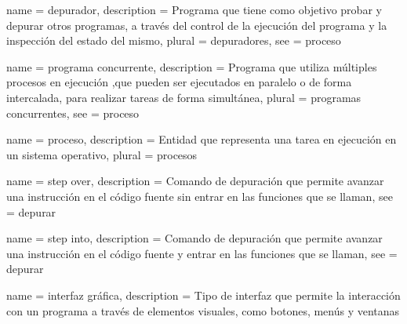 \makeglossaries





 {
    name = {depurador},
    description = {Programa que tiene como objetivo probar y depurar otros programas, a través del control de la ejecución del programa y la inspección del estado del mismo},
    plural = {depuradores},
    see = {proceso}
}

 {
    name = {programa concurrente},
    description = {Programa que utiliza múltiples procesos en ejecución ,que pueden ser ejecutados en paralelo o de forma intercalada, para realizar tareas de forma simultánea},
    plural = {programas concurrentes},
    see = {proceso}
}



 {
    name = {proceso},
    description = {Entidad que representa una tarea en ejecución en un sistema operativo},
    plural = {procesos}
}

 {
    name = {step over},
    description = {Comando de depuración que permite avanzar una instrucción en el código fuente sin entrar en las funciones que se llaman},
    see = {depurar}
}

 {
    name = {step into},
    description = {Comando de depuración que permite avanzar una instrucción en el código fuente y entrar en las funciones que se llaman},
    see = {depurar}
}

 {
    name = {interfaz gráfica},
    description = {Tipo de interfaz que permite la interacción con un programa a través de elementos visuales, como botones, menús y ventanas}
}

